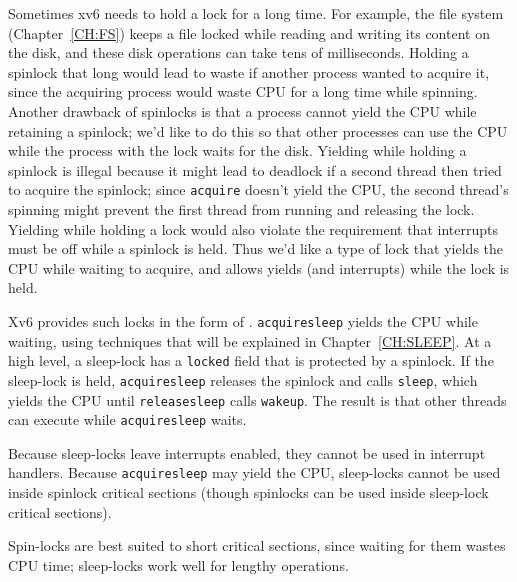 Sometimes xv6 needs to hold a lock for a long time. For example, the
file system (Chapter~\ref{CH:FS}) keeps a file locked while reading
and writing its content on the disk, and these disk operations can
take tens of milliseconds. Holding a spinlock that long would lead to
waste if another process wanted to acquire it, since the acquiring
process would waste CPU for a long time while spinning. Another
drawback of spinlocks is that a process cannot yield the CPU while
retaining a spinlock; we'd like to do this so that other processes can
use the CPU while the process with the lock waits for the disk.
Yielding while holding a spinlock is illegal because it might
lead to deadlock if a second thread then tried to acquire the spinlock;
since {\tt acquire} doesn't yield the CPU, the second thread's
spinning might
prevent the first thread from running and releasing the lock.
Yielding while holding a lock would also violate
the requirement that interrupts must be off while a spinlock is held.
Thus we'd like a type of lock that yields the CPU while waiting to
acquire, and allows yields (and interrupts) while the lock is held.

Xv6 provides such locks in the form of
.
\lstinline{acquiresleep}
yields the CPU while waiting,
using techniques that will be explained in
Chapter~\ref{CH:SLEEP}.
At a high level, a sleep-lock has a
\lstinline{locked}
field that is protected by a spinlock.
If the sleep-lock is held,
\lstinline{acquiresleep}
releases the spinlock and calls
\lstinline{sleep},
which yields the CPU until
\lstinline{releasesleep}
calls
\lstinline{wakeup}.
The result is that other threads can execute while
\lstinline{acquiresleep}
waits.

Because sleep-locks leave interrupts enabled, they cannot be
used in interrupt handlers.
Because
\lstinline{acquiresleep}
may yield the CPU,
sleep-locks cannot be used inside spinlock critical
sections (though spinlocks can be used inside sleep-lock
critical sections).

Spin-locks are best suited to short critical sections,
since waiting for them wastes CPU time;
sleep-locks work well for lengthy operations.

